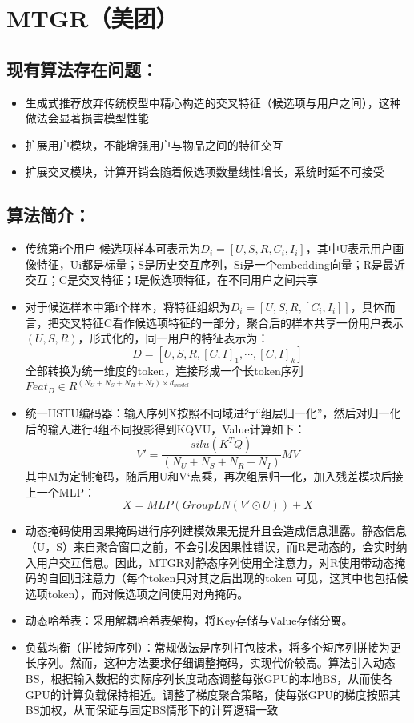 \documentclass[UTF8]{ctexart}
\begin{document}
\section{MTGR（美团）}
\subsection{现有算法存在问题：}  
\begin{itemize}
    \item 生成式推荐放弃传统模型中精心构造的交叉特征（候选项与用户之间），这种做法会显著损害模型性能
    \item 扩展用户模块，不能增强用户与物品之间的特征交互
    \item 扩展交叉模块，计算开销会随着候选项数量线性增长，系统时延不可接受
\end{itemize}

\subsection{算法简介：}
\begin{itemize}
	\item 传统第i个用户-候选项样本可表示为$D_i=[U,S,R,C_i,I_i]$，其中U表示用户画像特征，Ui都是标量；S是历史交互序列，Si是一个embedding向量；R是最近交互；C是交叉特征；I是候选项特征，在不同用户之间共享
    \item 对于候选样本中第i个样本，将特征组织为$D_i=[U,S,R,[C_i,I_i]]$，具体而言，把交叉特征C看作候选项特征的一部分，聚合后的样本共享一份用户表示$(U,S,R)$，形式化的，同一用户的特征表示为：
    $$ D=[U,S,R,[C,I]_1,\cdots,[C,I]_k] $$
    全部转换为统一维度的token，连接形成一个长token序列$Feat_D \in R^{(N_U+N_S+N_R+N_I)\times d_{model}}$
    \item 统一HSTU编码器：输入序列X按照不同域进行“组层归一化”，然后对归一化后的输入进行4组不同投影得到KQVU，Value计算如下：
    $$ V'=\frac{silu(K^TQ)}{(N_U+N_S+N_R+N_I)}MV  $$
    其中M为定制掩码，随后用U和V‘点乘，再次组层归一化，加入残差模块后接上一个MLP：
    $$ X=MLP(GroupLN(V'\odot U))+X $$
    \item 动态掩码使用因果掩码进行序列建模效果无提升且会造成信息泄露。静态信息（U，S）来自聚合窗口之前，不会引发因果性错误，而R是动态的，会实时纳入用户交互信息。因此，MTGR对静态序列使用全注意力，对R使用带动态掩码的自回归注意力（每个token只对其之后出现的token 可见，这其中也包括候选项token），而对候选项之间使用对角掩码。
    \item 动态哈希表：采用解耦哈希表架构，将Key存储与Value存储分离。
    \item 负载均衡（拼接短序列）：常规做法是序列打包技术，将多个短序列拼接为更长序列。然而，这种方法要求仔细调整掩码，实现代价较高。算法引入动态BS，根据输入数据的实际序列长度动态调整每张GPU的本地BS，从而使各GPU的计算负载保持相近。调整了梯度聚合策略，使每张GPU的梯度按照其BS加权，从而保证与固定BS情形下的计算逻辑一致
\end{itemize}
\end{document}
